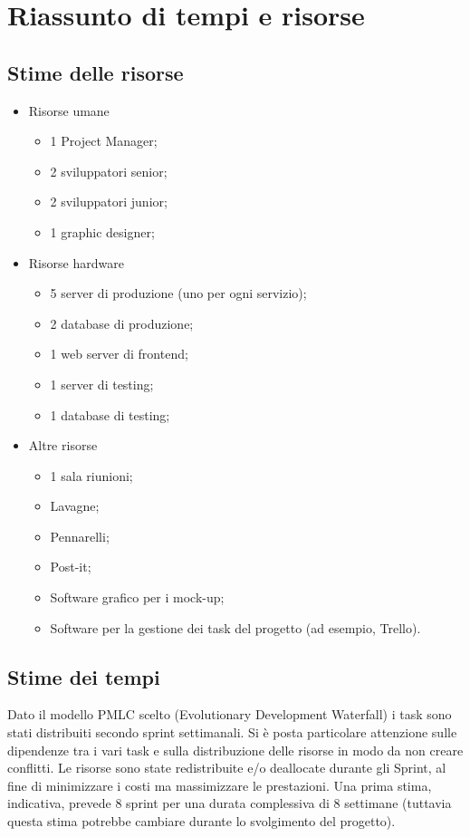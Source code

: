 \documentclass{article}
\begin{document}
  \newpage
  \section{Riassunto di tempi e risorse}

  \subsection{Stime delle risorse}
  \begin{itemize}
    \item Risorse umane
    \begin{itemize}
      \item 1 Project Manager;
      \item 2 sviluppatori senior;
      \item 2 sviluppatori junior;
      \item 1 graphic designer;
    \end{itemize}
    \item Risorse hardware
    \begin{itemize}
      \item 5 server di produzione (uno per ogni servizio);
      \item 2 database di produzione;
      \item 1 web server di frontend;
      \item 1 server di testing;
      \item 1 database di testing;
    \end{itemize}
    \item Altre risorse
    \begin{itemize}
      \item 1 sala riunioni;
      \item Lavagne;
      \item Pennarelli;
      \item Post-it;
      \item Software grafico per i mock-up;
      \item Software per la gestione dei task del progetto (ad esempio, Trello).
    \end{itemize}
  \end{itemize}

  \subsection{Stime dei tempi}

  Dato il modello PMLC scelto (Evolutionary Development Waterfall) i task sono stati distribuiti secondo sprint
    settimanali. Si è posta particolare attenzione sulle dipendenze tra i vari task e sulla distribuzione delle 
    risorse in modo da non creare conflitti.
    Le risorse sono state redistribuite e/o deallocate durante gli Sprint, al fine di minimizzare i costi 
    ma massimizzare le prestazioni.
    Una prima stima, indicativa, prevede 8 sprint per una durata complessiva di 8 settimane 
    (tuttavia questa stima potrebbe cambiare durante lo svolgimento del progetto). 
\end{document}
